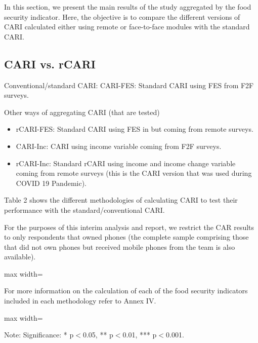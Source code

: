 \documentclass[11pt,harvard]{article}
\begin{document}
In this section, we present the main results of the study aggregated by the food security indicator. Here, the objective is to compare the different versions of CARI calculated either using remote or face-to-face modules with the standard CARI.

\subsection{CARI vs. rCARI}
Conventional/standard CARI:  CARI-FES: Standard CARI using FES from F2F surveys.

Other ways of aggregating CARI (that are tested)
\begin{itemize}[label=--, left=1.5em]
	\item rCARI-FES: Standard CARI using FES in but coming from remote surveys.
	\item CARI-Inc: CARI using income variable coming from F2F surveys.
	\item rCARI-Inc: Standard rCARI using income and income change variable coming from remote surveys (this is the CARI version that was used during COVID 19 Pandemic).
\end{itemize}

Table 2 shows the different methodologies of calculating CARI to test their performance with the standard/conventional CARI. 

For the purposes of this interim analysis and report, we restrict the CAR results to only respondents that owned phones (the complete sample comprising those that did not own phones but received mobile phones from the team is also available).  


\begin{table}[htbp]
	\centering
	\begin{adjustbox}{max width=\textwidth}
		\begin{threeparttable}
			\caption{Lists the different aggregation methods and indicators used for each methodology}
			\scriptsize
			 
			\label{tab:Aggregation_Table}
		\end{threeparttable}
	\end{adjustbox}
\end{table}
 
 For more information on the calculation of each of the food security indicators included in each methodology refer to Annex IV. 
 
 
\begin{table}[htbp]
	\centering
	\begin{adjustbox}{max width=\textwidth}
		\begin{threeparttable}
			\caption{Impact of Survey Modality: Standard CARI-FES vs. Standard rCARI-Inc}
			\scriptsize
			 
			\label{tab:CARI_rCARI_Modality_All_Country}
			\begin{tablenotes}
				\item Note: Significance: * p$<$0.05, ** p$<$0.01, *** p$<$0.001. 
			\end{tablenotes}
		\end{threeparttable}
	\end{adjustbox}
\end{table}
\end{document}
